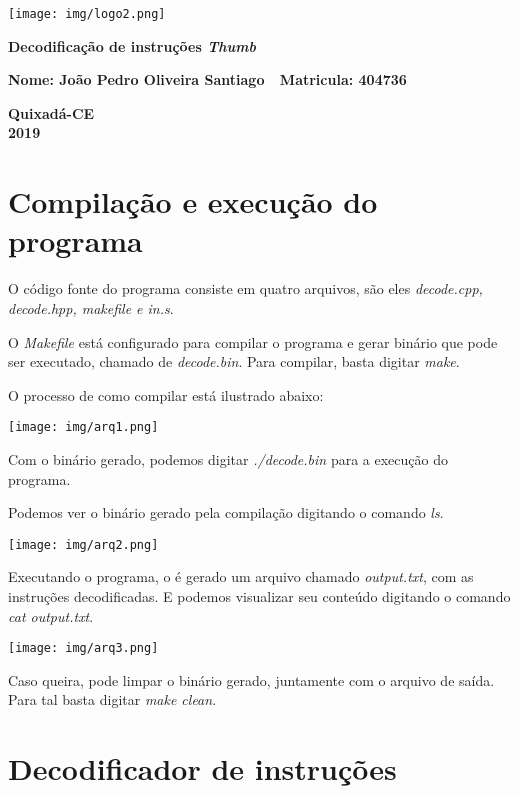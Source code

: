 \documentclass[a4paper,10pt]{article}
\begin{document}
\thispagestyle{empty}
\begin{center}

	\texttt{[image: img/logo2.png]}
		
	\vspace*{4cm}
		
	{\Large \bf Decodificação de instruções \textit{Thumb}}
		
	\vspace*{4.5cm}
		
	{\Large \bf Nome: João Pedro Oliveira Santiago	\,\,  Matricula: 404736}
		
		
	\vspace*{9.5cm}
		
	{\Large \bf Quixadá-CE\\
	2019}

\end{center}
	
\setcounter{page}{0}
	\section*{Compilação e execução do programa}
	
	O código fonte do programa consiste em quatro arquivos, são eles \textit{decode.cpp, decode.hpp, makefile e in.s}.
	
	O \textit{Makefile} está configurado para compilar o programa e gerar binário que pode ser executado, chamado de \textit{decode.bin}. Para compilar, basta digitar \textit{make}.
	
	O processo de como compilar está ilustrado abaixo:
	\begin{center}
		\texttt{[image: img/arq1.png]}
	\end{center}
	
	Com o binário gerado, podemos digitar \textit{./decode.bin} para a execução do programa.
	
	Podemos ver o binário gerado pela compilação digitando o comando \textit{ls}.
	
	\begin{center}
		\texttt{[image: img/arq2.png]}
	\end{center}	
	
	Executando o programa, o é gerado um arquivo chamado \textit{output.txt}, com as instruções decodificadas. E podemos visualizar seu conteúdo digitando o comando \textit{cat output.txt}.
	\begin{center}
		\texttt{[image: img/arq3.png]}
	\end{center}
	
	Caso queira, pode limpar o binário gerado, juntamente com o arquivo de saída. Para tal basta digitar \textit{make clean}.
	
	\section*{Decodificador de instruções}
	
	
\end{document}
